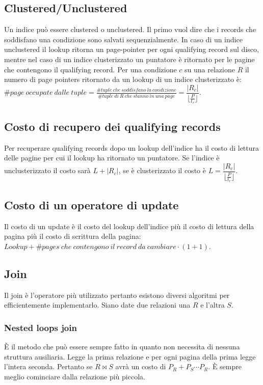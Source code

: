 \subsection{Clustered/Unclustered}
Un indice pu\`o essere clustered o unclustered. Il primo vuol dire che i records che soddisfano una condizione sono salvati sequenzialmente. In caso di un indice unclustered il lookup ritorna un page-pointer per
ogni qualifying record sul disco, mentre nel caso di un indice clusterizzato un puntatore \`e ritornato per le pagine che contengono il qualifying record. Per una condizione $c$ su una relazione $R$ il numero
di page pointers ritornato da un lookup di un indice clusterizzato \`e: $\# page\ occupate\ dalle\ tuple=\frac{\# tuple\ che\ soddisfano\ la\ condizione}{\# tuple\ di\ R\ che\ stanno\ in\ una\ page}=\dfrac{|R_c|}{
\lfloor \frac{P}{t_r}\rfloor}$.
\subsection{Costo di recupero dei qualifying records}
Per recuperare qualifying records dopo un lookup dell'indice ha il costo di lettura delle pagine per cui il lookup ha ritornato un puntatore. Se l'indice \`e unclusterizzato il costo sar\`a $L+|R_c|$, se \`e 
clusterizzato il costo \`e $L=\dfrac{|R_c|}{\lfloor \frac{P}{t_r}\rfloor}$. 
\subsection{Costo di un operatore di update}
Il costo di un update \`e il costo del lookup dell'indice pi\`u il costo di lettura della pagina pi\`u il costo di scrittura della pagina: $Lookup+\# pages\ che\ contengono\ il\ record\ da\ cambiare\cdot(1+1)$.
\subsection{Join}
Il join \`e l'operatore pi\`u utilizzato pertanto esistono diversi algoritmi per efficientemente implementarlo. Siano date due relazioni una $R$ e l'altra $S$.
\subsubsection{Nested loops join}
\`E il metodo che pu\`o essere sempre fatto in quanto non necessita di nessuna struttura ausiliaria. Legge la prima relazione e per ogni pagina della prima legge l'intera seconda. Pertanto se $R\bowtie S$ avr\`a
un costo di $P_R+P_S\cdots P_R$. \`E sempre meglio cominciare dalla relazione pi\`u piccola.
